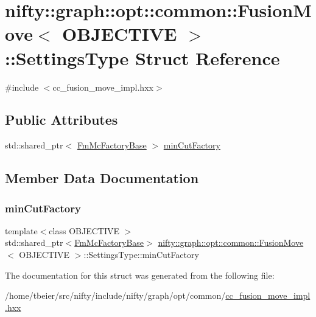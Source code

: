 \hypertarget{structnifty_1_1graph_1_1opt_1_1common_1_1FusionMove_1_1SettingsType}{}\section{nifty\+:\+:graph\+:\+:opt\+:\+:common\+:\+:Fusion\+Move$<$ O\+B\+J\+E\+C\+T\+I\+VE $>$\+:\+:Settings\+Type Struct Reference}
\label{structnifty_1_1graph_1_1opt_1_1common_1_1FusionMove_1_1SettingsType}


{\ttfamily \#include $<$cc\+\_\+fusion\+\_\+move\+\_\+impl.\+hxx$>$}

\subsection*{Public Attributes}
\begin{DoxyCompactItemize}
\item 
std\+::shared\+\_\+ptr$<$ \hyperlink{classnifty_1_1graph_1_1opt_1_1common_1_1FusionMove_af50b93c2e6e830750451b8cf05b4b657}{Fm\+Mc\+Factory\+Base} $>$ \hyperlink{structnifty_1_1graph_1_1opt_1_1common_1_1FusionMove_1_1SettingsType_a69e5f13d908f064b1a2895c0d050c04a}{min\+Cut\+Factory}
\end{DoxyCompactItemize}


\subsection{Member Data Documentation}
\mbox{\label{structnifty_1_1graph_1_1opt_1_1common_1_1FusionMove_1_1SettingsType_a69e5f13d908f064b1a2895c0d050c04a}} 
\subsubsection{\texorpdfstring{min\+Cut\+Factory}{minCutFactory}}
{\footnotesize\ttfamily template$<$class O\+B\+J\+E\+C\+T\+I\+VE $>$ \\
std\+::shared\+\_\+ptr$<$\hyperlink{classnifty_1_1graph_1_1opt_1_1common_1_1FusionMove_af50b93c2e6e830750451b8cf05b4b657}{Fm\+Mc\+Factory\+Base}$>$ \hyperlink{classnifty_1_1graph_1_1opt_1_1common_1_1FusionMove}{nifty\+::graph\+::opt\+::common\+::\+Fusion\+Move}$<$ O\+B\+J\+E\+C\+T\+I\+VE $>$\+::Settings\+Type\+::min\+Cut\+Factory}



The documentation for this struct was generated from the following file\+:\begin{DoxyCompactItemize}
\item 
/home/tbeier/src/nifty/include/nifty/graph/opt/common/\hyperlink{cc__fusion__move__impl_8hxx}{cc\+\_\+fusion\+\_\+move\+\_\+impl.\+hxx}\end{DoxyCompactItemize}
